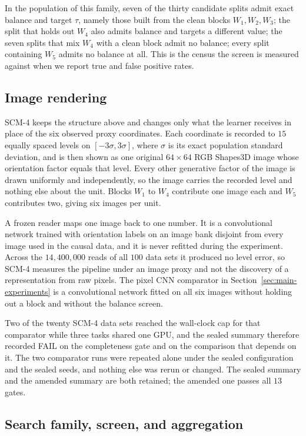 In the population of this family, seven of the thirty candidate splits admit exact balance and target $\tau$, namely those built from the clean blocks $W_1,W_2,W_3$; the split that holds out $W_4$ also admits balance and targets a different value; the seven splits that mix $W_4$ with a clean block admit no balance; every split containing $W_5$ admits no balance at all. This is the census the screen is measured against when we report true and false positive rates.

\subsection{Image rendering}
\label{sec:appendix-image-rendering}

SCM-4 keeps the structure above and changes only what the learner receives in place of the six observed proxy coordinates. Each coordinate is recorded to $15$ equally spaced levels on $[-3\sigma,3\sigma]$, where $\sigma$ is its exact population standard deviation, and is then shown as one original $64\times64$ RGB Shapes3D image whose orientation factor equals that level. Every other generative factor of the image is drawn uniformly and independently, so the image carries the recorded level and nothing else about the unit. Blocks $W_1$ to $W_4$ contribute one image each and $W_5$ contributes two, giving six images per unit.

A frozen reader maps one image back to one number. It is a convolutional network trained with orientation labels on an image bank disjoint from every image used in the causal data, and it is never refitted during the experiment. Across the $14{,}400{,}000$ reads of all $100$ data sets it produced no level error, so SCM-4 measures the pipeline under an image proxy and not the discovery of a representation from raw pixels. The pixel CNN comparator in Section~\ref{sec:main-experiments} is a convolutional network fitted on all six images without holding out a block and without the balance screen.

Two of the twenty SCM-4 data sets reached the wall-clock cap for that comparator while three tasks shared one GPU, and the sealed summary therefore recorded FAIL on the completeness gate and on the comparison that depends on it. The two comparator runs were repeated alone under the sealed configuration and the sealed seeds, and nothing else was rerun or changed. The sealed summary and the amended summary are both retained; the amended one passes all $13$ gates.

\subsection{Search family, screen, and aggregation}

